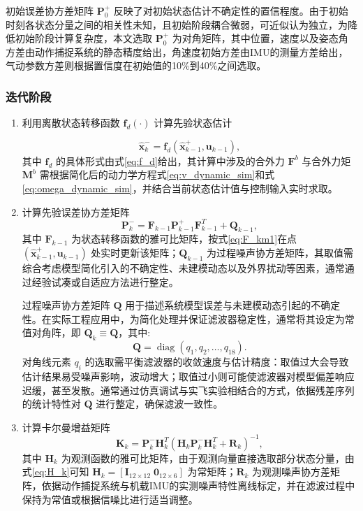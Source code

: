     初始误差协方差矩阵 $\bm{P}_0^+$ 反映了对初始状态估计不确定性的置信程度。由于初始时刻各状态分量之间的相关性未知，且初始阶段耦合微弱，可近似认为独立，为降低初始阶段计算复杂度，本文选取 $\bm{P}_0^+$ 为对角矩阵，其中位置，速度以及姿态角方差由动作捕捉系统的静态精度给出，角速度初始方差由IMU的测量方差给出，气动参数方差则根据置信度在初始值的10\%到40\%之间选取。

\subsubsection{迭代阶段}

\begin{enumerate}
    \item {利用离散状态转移函数 $\bm{f}_d(\cdot)$ 计算先验状态估计}

    \begin{equation}
        \hat{\bm{x}}_{k}^{-} = \bm{f}_d(\hat{\bm{x}}_{k-1}^{+}, \bm{u}_{k-1}),
    \end{equation}
    其中 $\bm{f}_d$ 的具体形式由式\eqref{eq:f_d}给出，其计算中涉及的合外力 $\bm{F}^b$ 与合外力矩 $\bm{M}^b$ 需根据简化后的动力学方程式\eqref{eq:v_dynamic_sim}和式\eqref{eq:omega_dynamic_sim}，并结合当前状态估计值与控制输入实时求取。

    \item {计算先验误差协方差矩阵}
    \begin{equation}
        \bm{P}_{k}^{-} = \bm{F}_{k-1} \bm{P}_{k-1}^{+} \bm{F}_{k-1}^{T} + \bm{Q}_{k-1},
    \end{equation}
    其中 $\bm{F}_{k-1}$ 为状态转移函数的雅可比矩阵，按式\eqref{eq:F_km1}在点 $(\hat{\bm{x}}_{k-1}^{+}, \bm{u}_{k-1})$ 处实时更新该矩阵；$\bm{Q}_{k-1}$ 为过程噪声协方差矩阵，其取值需综合考虑模型简化引入的不确定性、未建模动态以及外界扰动等因素，通常通过经验试凑或自适应方法进行整定。

    过程噪声协方差矩阵 $\bm{Q}$ 用于描述系统模型误差与未建模动态引起的不确定性。在实际工程应用中，为简化处理并保证滤波器稳定性，通常将其设定为常值对角阵，即 $\bm{Q}_k \equiv \bm{Q}$，其中:
    \begin{equation}
        \bm{Q} = \operatorname{diag}(q_1, q_2, \dots, q_{18}).
    \end{equation}
     对角线元素 $q_i$ 的选取需平衡滤波器的收敛速度与估计精度：取值过大会导致估计结果易受噪声影响，波动增大；取值过小则可能使滤波器对模型偏差响应迟缓，甚至发散。通常通过仿真调试与实飞实验相结合的方式，依据残差序列的统计特性对 $\bm{Q}$ 进行整定，确保滤波一致性。

    \item {计算卡尔曼增益矩阵}
    \begin{equation}
        \bm{K}_k = \bm{P}_{k}^{-} \bm{H}_k^{T} \left( \bm{H}_k \bm{P}_{k}^{-} \bm{H}_k^{T} + \bm{R}_k \right)^{-1},
    \end{equation}
    其中 $\bm{H}_k$ 为观测函数的雅可比矩阵，由于观测向量直接选取部分状态分量，由式\eqref{eq:H_k}可知 $\bm{H}_k = [\bm{I}_{12\times 12} \; \bm{0}_{12\times 6}]$ 为常矩阵；$\bm{R}_k$ 为观测噪声协方差矩阵，依据动作捕捉系统与机载IMU的实测噪声特性离线标定，并在滤波过程中保持为常值或根据信噪比进行适当调整。
    

\end{enumerate}
